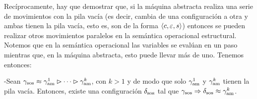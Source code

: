 Recíprocamente, hay que demostrar que, si la máquina abstracta realiza una serie de movimientos con la pila vacía (es decir, cambia de una configuración a otra y ambas tienen la pila vacía, esto es, son de la forma $\langle c, \varepsilon, s \rangle$) entonces se pueden realizar otros movimientos paralelos en la semántica operacional estructural. Notemos que en la semántica operacional las variables se evalúan en un paso mientras que, en la máquina abstracta, esto puede llevar más de uno. Tenemos entonces:
\begin{lema}
-Sean $\gamma_{\mathrm{sos}}\approx \gamma_{\mathrm{am}}^1 \rhd \dots \rhd \gamma_{\mathrm{am}}^k$, con $k>1$ y de modo que solo $\gamma_{\mathrm{am}}^1$ y $\gamma_{\mathrm{am}}^k$ tienen la pila vacía. Entonces, existe una configuración $\delta_{\mathrm{sos}}$ tal que $\gamma_{\mathrm{sos}}\Rightarrow \delta_{\mathrm{sos}}\approx \gamma_{\mathrm{am}}^k$. 


\end{lema}
